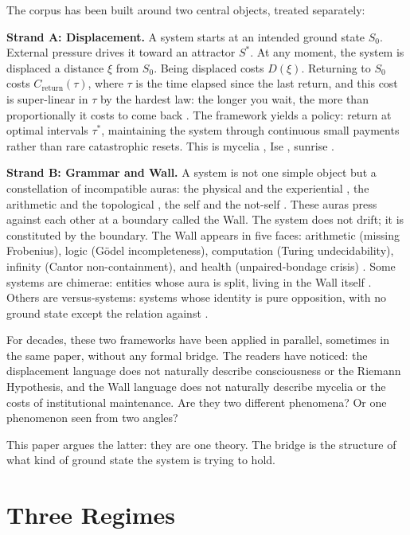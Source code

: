 \documentclass[12pt]{article}
\theoremstyle{definition}
\theoremstyle{remark}
\begin{document}
The corpus has been built around two central objects, treated separately:

\textbf{Strand A: Displacement.} A system starts at an intended ground state $S_0$. External pressure drives it toward an attractor $S^*$. At any moment, the system is displaced a distance $\xi$ from $S_0$. Being displaced costs $D(\xi)$. Returning to $S_0$ costs $C_{\text{return}}(\tau)$, where $\tau$ is the time elapsed since the last return, and this cost is super-linear in $\tau$ by the hardest law: the longer you wait, the more than proportionally it costs to come back \cite{maintenance}. The framework yields a policy: return at optimal intervals $\tau^*$, maintaining the system through continuous small payments rather than rare catastrophic resets. This is mycelia \cite{mycelia}, Ise \cite{shinto}, sunrise \cite{sunrise}.

\textbf{Strand B: Grammar and Wall.} A system is not one simple object but a constellation of incompatible auras: the physical and the experiential \cite{consciousness}, the arithmetic and the topological \cite{synthesis}, the self and the not-self \cite{five}. These auras press against each other at a boundary called the Wall. The system does not drift; it is constituted by the boundary. The Wall appears in five faces: arithmetic (missing Frobenius), logic (G\"odel incompleteness), computation (Turing undecidability), infinity (Cantor non-containment), and health (unpaired-bondage crisis) \cite{five}. Some systems are chimerae: entities whose aura is split, living in the Wall itself \cite{chimera}. Others are versus-systems: systems whose identity is pure opposition, with no ground state except the relation against \cite{versus}.

For decades, these two frameworks have been applied in parallel, sometimes in the same paper, without any formal bridge. The readers have noticed: the displacement language does not naturally describe consciousness or the Riemann Hypothesis, and the Wall language does not naturally describe mycelia or the costs of institutional maintenance. Are they two different phenomena? Or one phenomenon seen from two angles?

This paper argues the latter: they are one theory. The bridge is the structure of what kind of ground state the system is trying to hold.

\section{Three Regimes}
\end{document}
